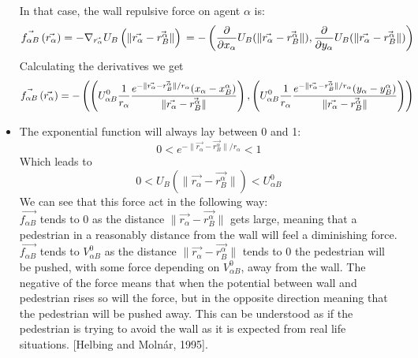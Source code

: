 \begin{itemize}
In that case, the wall repulsive force on agent $ \alpha $ is:
\begin{equation}
    \vec{f_{\alpha B}} \left( \vec{r_{\alpha}} \right) =
    - \nabla_{\vec{r_{\alpha}}} U_{B}
    \left( \| \vec{r_{\alpha}} - \vec{r_{B}^{\alpha}} \| \right)\\
=-\left( \frac{\partial}{\partial x_{\alpha}}U_{B}( \| \vec{r_{\alpha}} - \vec{r_{B}^{\alpha}} \|), \frac{\partial}{\partial y_{\alpha}}U_{B}( \| \vec{r_{\alpha}} - \vec{r_{B}^{\alpha}} \|)\right) \\
\end{equation}
Calculating the derivatives we get 
\begin{equation}
    \vec{f_{\alpha B}} \left( \vec{r_{\alpha}} \right) 
=-\left(\left(U^0_{\alpha B}\frac{1}{r_{\alpha}}\frac{e^{- \| \vec{r_{\alpha}} - \vec{r_{B}^{\alpha}} \| / r_{\alpha} } (x_{\alpha}-x_B^{\alpha})}{\| \vec{r_{\alpha}} - \vec{r_{B}^{\alpha}} \| }\right),\left(U^0_{\alpha B}\frac{1}{r_{\alpha}}\frac{e^{- \| \vec{r_{\alpha}} - \vec{r_{B}^{\alpha}} \| / r_{\alpha} } (y_{\alpha}-y_B^{\alpha})}{\| \vec{r_{\alpha}} - \vec{r_{B}^{\alpha}} \| }\right)\right) \\
\end{equation}

\item The exponential function will always lay between 0 and 1:
\begin{equation}
0 < e^{ -\| \vec{r_{\alpha}} - \vec{r_{B}^{\alpha}} \| /r_\alpha} < 1
\end{equation}
Which leads to
\begin{equation}
0< U_{B} \left( \| \vec{r_{\alpha}} - \vec{r_{B}^{\alpha}} \| \right) < U^0_{\alpha B}
\end{equation}
We can see that this force act in the following way:\\
$\vec{f_{\alpha B}}$ tends to 0 as the distance $ \| \vec{r_{\alpha}} - \vec{r_{B}^{\alpha}} \|$ gets large, meaning that a pedestrian in a reasonably distance from the wall will feel a diminishing force. $\vec{f_{\alpha B}}$ tends to $V^0_{\alpha B}$ as the distance $ \| \vec{r_{\alpha}} - \vec{r_{B}^{\alpha}} \|$ tends to $0$ the pedestrian will be pushed, with some force depending on $V^0_{\alpha B}$, away from the wall. 
The negative of the force means that when the potential between wall and pedestrian rises so will the force, but in the opposite direction meaning that the pedestrian will be pushed away. This can be understood as if the pedestrian is trying to avoid the wall as it is expected from real life situations.
 [Helbing and Molnár, 1995]. %
\end{itemize}

